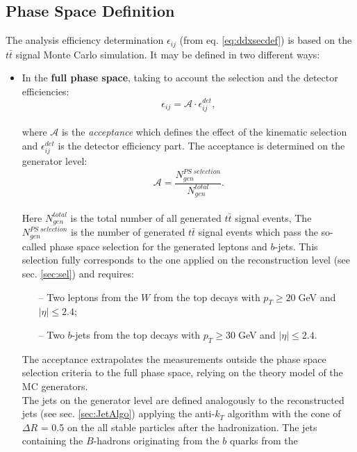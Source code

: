 \subsection{Phase Space Definition}

The analysis efficiency determination $\epsilon_{ij}$ (from eq. \ref{eq:ddxsecdef}) is based on the $t\bar{t}$ signal Monte Carlo simulation.
It may be defined in two different ways:

\begin{itemize}
 \item In the \textbf{full phase space}, taking to account the selection and the detector efficiencies:
 \begin{equation}\label{eq:epsanal}
  \epsilon_{ij} = \mathcal{A} \cdot \epsilon_{ij}^{det},
 \end{equation}
 \\
 where $\mathcal{A}$ is the \textit{acceptance} which defines the effect of the kinematic selection and $\epsilon_{ij}^{det}$ is the detector efficiency part.
 The acceptance is determined on the generator level:
 \\
 \begin{equation}\label{eq:accep}
  \mathcal{A} = \frac{N^{PS\;selection}_{gen}}{N^{total}_{gen}}.
 \end{equation}
 \\
 Here $N^{total}_{gen}$ is the total number of all generated $t\bar{t}$ signal events,
 The $N_{gen}^{PS\;selection}$ is the number of generated $t\bar{t}$ signal events which pass the so-called phase space selection for the generated leptons and 
 $b$-jets. This selection fully corresponds to the one applied on the reconstruction level (see sec. \ref{sec:sel}) and requires:
 \begin{itemize}
  \item[--] Two leptons from the $W$ from the top decays with $p_{T} \geq 20\;$GeV and $|\eta| \leq 2.4$;
  \item[--] Two $b$-jets from the top decays with $p_{T} \geq 30\;$GeV and $|\eta| \leq 2.4$.
 \end{itemize}
 The acceptance extrapolates the measurements outside the phase space selection criteria to the full phase space, relying on the theory model of the MC generators.
 \\
 The jets on the generator level are defined analogously to the reconstructed jets (see sec. \ref{sec:JetAlgo}) applying the anti-$k_{T}$ algorithm with the 
 cone of $\Delta R$ = 0.5 on the all stable particles after the hadronization. The jets containing the $B$-hadrons originating from the $b$ quarks from the

\end{itemize}
